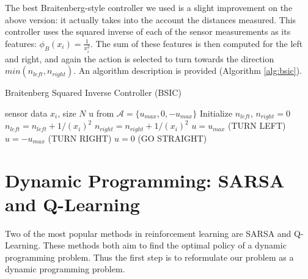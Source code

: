 \documentclass{article}
\begin{document}
The best Braitenberg-style controller we used is a slight improvement on the above version: it actually takes into the account the distances measured.  This controller uses the squared inverse of each of the sensor measurements as its features: $\phi_{B} (x_i) = \frac{1}{x_i^2}$.  The sum of these features is then computed for the left and right, and again the action is selected to turn towards the direction $min(n_{left}, n_{right})$.  An algorithm description is provided (Algorithm \ref{alg:bsic}).
%
\begin{algorithm}[]
   \caption{Braitenberg Squared Inverse Controller (BSIC)}
   \label{alg:bsic}
\begin{algorithmic}
    sensor data $x_i$, size $N$
    u from $\mathcal{A} =  \{u_{max}, 0, -u_{max}\}$
   \STATE Initialize $n_{left}$, $n_{right} = 0$
   \STATE $n_{left} = n_{left} + 1/(x_i)^2$
   \ENDFOR
   \STATE $n_{right} = n_{right} + 1/(x_i)^2$
   \ENDFOR
   \STATE $u = u_{max}$ (TURN LEFT)
   \ELSE 
   \STATE $u = -u_{max}$ (TURN RIGHT)
   \ELSE 
   \STATE $u=0$ (GO STRAIGHT)
   \ENDIF
   \ENDIF

\end{algorithmic}
\end{algorithm}



\section{Dynamic Programming: SARSA and Q-Learning}
Two of the most popular methods in reinforcement learning are SARSA and Q-Learning. These methods both aim to find the optimal policy of a dynamic programming problem. Thus the first step is to reformulate our problem as a dynamic programming problem. 
\end{document}
